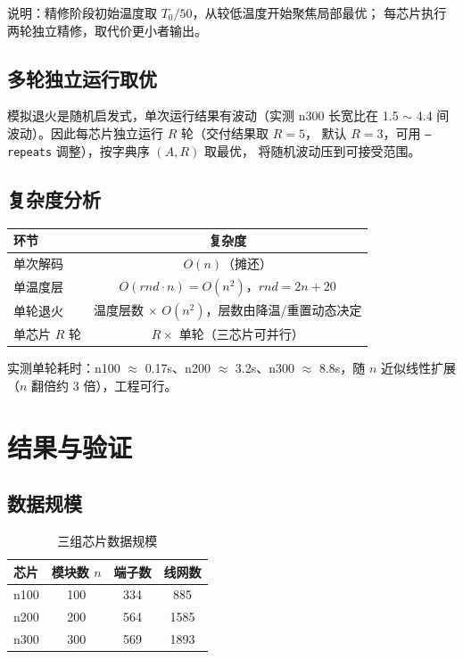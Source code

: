 \documentclass[12pt,a4paper]{article}
\begin{document}
说明：精修阶段初始温度取 $T_0 / 50$，从较低温度开始聚焦局部最优；
每芯片执行两轮独立精修，取代价更小者输出。

\subsection{多轮独立运行取优}

模拟退火是随机启发式，单次运行结果有波动（实测 n300 长宽比在
1.5 $\sim$ 4.4 间波动）。因此每芯片独立运行 $R$ 轮（交付结果取 $R = 5$，
默认 $R = 3$，可用 \texttt{--repeats} 调整），按字典序 $(A, R)$ 取最优，
将随机波动压到可接受范围。

\subsection{复杂度分析}

\begin{table}[H]
\centering
\small
\begin{tabular}{lc}
\toprule
环节 & 复杂度 \\
\midrule
单次解码 & $O(n)$（摊还） \\
单温度层 & $O(rnd \cdot n) = O(n^2)$，$rnd = 2n + 20$ \\
单轮退火 & 温度层数 $\times$ $O(n^2)$，层数由降温/重置动态决定 \\
单芯片 $R$ 轮 & $R \times$ 单轮（三芯片可并行） \\
\bottomrule
\end{tabular}
\end{table}

实测单轮耗时：n100 $\approx$ 0.17s、n200 $\approx$ 3.2s、n300
$\approx$ 8.8s，随 $n$ 近似线性扩展（$n$ 翻倍约 3 倍），工程可行。

\section{结果与验证}

\subsection{数据规模}

\begin{table}[H]
\centering
\caption{三组芯片数据规模}
\begin{tabular}{lccc}
\toprule
芯片 & 模块数 $n$ & 端子数 & 线网数 \\
\midrule
n100 & 100 & 334 & 885 \\
n200 & 200 & 564 & 1585 \\
n300 & 300 & 569 & 1893 \\
\bottomrule
\end{tabular}
\end{table}
\end{document}
